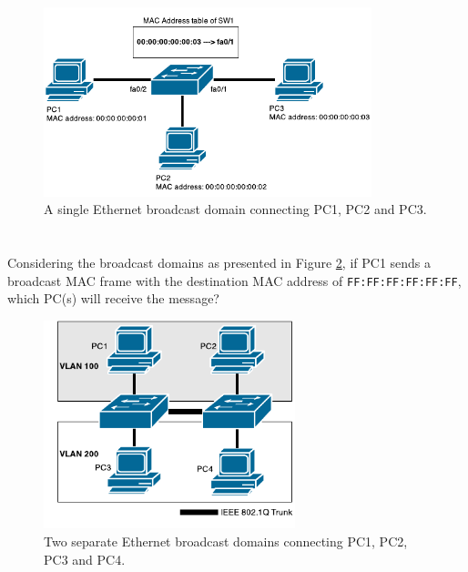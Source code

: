 \documentclass[pdftex,12pt,a4paper]{article}
\begin{document}
        \begin{figure}[tbh]
            \centering
            \includegraphics[width=0.85\textwidth]{figures/diag1.pdf}
            \caption{A single Ethernet broadcast domain connecting PC1, PC2 and PC3.}
            \label{fig:bd}
        \end{figure}

        \newpage

    \section{}
        Considering the broadcast domains as presented in Figure
        \ref{fig:vlan}, if PC1 sends a broadcast MAC frame with the destination
        MAC address of \texttt{FF:FF:FF:FF:FF:FF}, which PC(s) will receive the message?
        \begin{figure}[tbh]
            \centering
            \includegraphics[width=0.65\textwidth]{figures/diag2.pdf}
            \caption{Two separate Ethernet broadcast domains connecting PC1,
            PC2, PC3 and PC4.}
            \label{fig:vlan}
        \end{figure}

        \newpage
\end{document}
